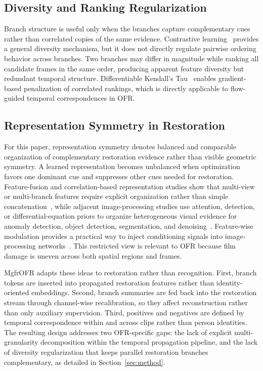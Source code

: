 \subsection{Diversity and Ranking Regularization}
\label{subsec:diversity_ranking}

Branch structure is useful only when the branches capture complementary cues rather than correlated copies of the same evidence. Contrastive learning~\cite{chen2020mocov2} provides a general diversity mechanism, but it does not directly regulate pairwise ordering behavior across branches. Two branches may differ in magnitude while ranking all candidate frames in the same order, producing apparent feature diversity but redundant temporal structure. Differentiable Kendall's Tau~\cite{zheng2023diffkendall} enables gradient-based penalization of correlated rankings, which is directly applicable to flow-guided temporal correspondences in OFR.

\subsection{Representation Symmetry in Restoration}
\label{subsec:symmetry_ai}

For this paper, representation symmetry denotes balanced and comparable organization of complementary restoration evidence rather than visible geometric symmetry. A learned representation becomes unbalanced when optimization favors one dominant cue and suppresses other cues needed for restoration. Feature-fusion and correlation-based representation studies show that multi-view or multi-branch features require explicit organization rather than simple concatenation~\cite{yu2021multiview_tensor_fusion,qian2020multiview_matrix_correlation}, while adjacent image-processing studies use attention, detection, or differential-equation priors to organize heterogeneous visual evidence for anomaly detection, object detection, segmentation, and denoising~\cite{cui2024video_anomaly_iqa_attention,yin2024improved_faster_rcnn,tian2020pde_segmentation_denoising}. Feature-wise modulation provides a practical way to inject conditioning signals into image-processing networks~\cite{perez2018film}. This restricted view is relevant to OFR because film damage is uneven across both spatial regions and frames.

MgfrOFR adapts these ideas to restoration rather than recognition. First, branch tokens are inserted into propagated restoration features rather than identity-oriented embeddings. Second, branch summaries are fed back into the restoration stream through channel-wise recalibration, so they affect reconstruction rather than only auxiliary supervision. Third, positives and negatives are defined by temporal correspondence within and across clips rather than person identities. The resulting design addresses two OFR-specific gaps: the lack of explicit multi-granularity decomposition within the temporal propagation pipeline, and the lack of diversity regularization that keeps parallel restoration branches complementary, as detailed in Section~\ref{sec:method}.
